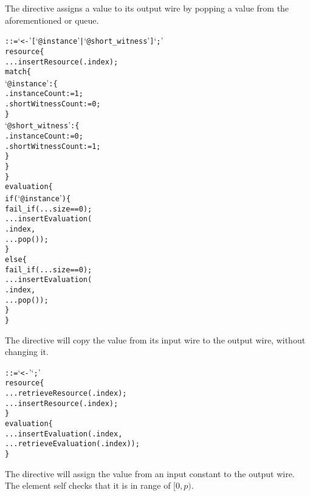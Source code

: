 The  directive assigns a value to its output wire by popping a value from the aforementioned  or  queue. \\

\begin{alltt}\ttSyn
   ::=  `<-' [ `@instance' | `@short_witness' ] `;'\ttSem
  resource \{
    ...insertResource(.index);
    match \{
      `@instance': \{
        .instanceCount := 1;
        .shortWitnessCount := 0;
      \}
      `@short_witness': \{
        .instanceCount := 0;
        .shortWitnessCount := 1;
      \}
    \}
  \}
  evaluation \{
    if(`@instance') \{
      fail_if(...size == 0);
      ...insertEvaluation(
        .index,
        ...pop());
    \}
    else \{
      fail_if(...size == 0);
      ...insertEvaluation(
        .index,
        ...pop());
    \}
  \}
\end{alltt}

The  directive will copy the value from its input wire to the output wire, without changing it.\\

\begin{alltt}\ttSyn
   ::=  `<-'  `;'\ttSem
  resource \{
    ...retrieveResource(.index);
    ...insertResource(.index);
  \}
  evaluation \{
    ...insertEvaluation(.index,
        ...retrieveEvaluation(.index));
  \}
\end{alltt}

The  directive will assign the value from an input constant to the output wire.
The  element self checks that it is in range of $[0, p)$.\\

